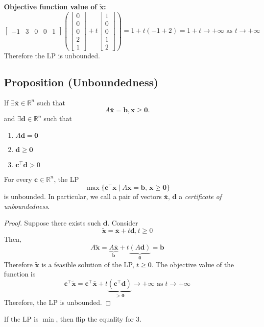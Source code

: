 \textbf{Objective function value of $\tilde{\mathbf{x}}$:}
\[
\begin{bmatrix}
    -1 & 3 & 0 & 0 & 1
\end{bmatrix}
\left(\begin{bmatrix}
    0\\
    0\\
    0\\
    2\\
    1  
\end{bmatrix}
+
t
\begin{bmatrix}
    1\\
    0\\
    0\\
    1\\
    2
\end{bmatrix}\right)
=
1+t(-1+2)=1+t\rightarrow+\infty \text{ as }t\rightarrow+\infty\]
Therefore the LP is unbounded.

\subsection{Proposition (Unboundedness)}
If $\exists \mathbf{\bar{x}}\in\mathbb{R}^n$ such that
\[A\mathbf{\bar{x}}=\mathbf{b}, \mathbf{x}\ge \mathbf{0}.\]
and $\exists\mathbf{d}\in\mathbb{R}^n$ such that
\begin{enumerate}
    \item $A\mathbf{d}=\mathbf{0}$
    \item $\mathbf{d}\ge \mathbf{0}$
    \item $\mathbf{c}^\top \mathbf{d}>0$
\end{enumerate}
For every $\mathbf{c}\in\mathbb{R}^n$, the LP
\[\max \{\mathbf{c}^\top \mathbf{x} \mid A\mathbf{x}=\mathbf{b}\text{, }
\mathbf{x}\ge\mathbf{0}\}\]
is unbounded. In particular, we call a pair of vectors $\mathbf{\bar{x}}$, $\mathbf{d}$ a
\emph{certificate of unboundedness}.

\begin{proof}
    Suppose there exists such $\mathbf{d}$. Consider
    \[\tilde{\mathbf{x}}=\bar{\mathbf{x}}+t\mathbf{d}, t\ge 0\]
Then,
\[A\tilde{\mathbf{x}}=
\underbrace{A\bar{\mathbf{x}}}_{\mathbf{b}}+
t\underbrace{(A\mathbf{d})}_{\mathbf{0}}=\mathbf{b}\]
Therefore $\tilde{\mathbf{x}}$ is a feasible solution of the LP, $t\ge 0$.
The objective value of the function is
\[\mathbf{c}^\top \tilde{\mathbf{x}}=\mathbf{c}^\top \bar{\mathbf{x}}+t
\underbrace{(\mathbf{c}^\top \mathbf{d})}_{>\mathbf{0}}\rightarrow +\infty\text{ as }t\rightarrow+\infty\]
Therefore, the LP is unbounded.
\end{proof}
\begin{remark}
    If the LP is $\min$, then flip the equality for 3.
\end{remark}

